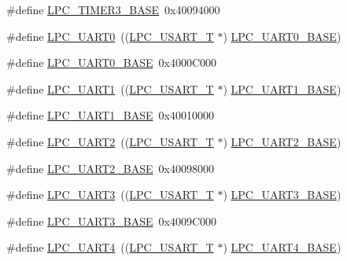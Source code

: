 \begin{DoxyCompactItemize}
\item 
\#define \hyperlink{group__PERIPH__407X__8X__BASE_ga002e95d51eef32473052ea2575440eac}{L\+P\+C\+\_\+\+T\+I\+M\+E\+R3\+\_\+\+B\+A\+SE}~0x40094000
\item 
\#define \hyperlink{group__PERIPH__407X__8X__BASE_ga6ba29f0f9b8af2f72e303533185bcc82}{L\+P\+C\+\_\+\+U\+A\+R\+T0}~((\hyperlink{structLPC__USART__T}{L\+P\+C\+\_\+\+U\+S\+A\+R\+T\+\_\+T}            $\ast$) \hyperlink{group__PERIPH__407X__8X__BASE_gaa96fb70405a1298b350fc6f0ad0af997}{L\+P\+C\+\_\+\+U\+A\+R\+T0\+\_\+\+B\+A\+SE})
\item 
\#define \hyperlink{group__PERIPH__407X__8X__BASE_gaa96fb70405a1298b350fc6f0ad0af997}{L\+P\+C\+\_\+\+U\+A\+R\+T0\+\_\+\+B\+A\+SE}~0x4000\+C000
\item 
\#define \hyperlink{group__PERIPH__407X__8X__BASE_ga83ea0dab4dcb7411c2e1de20050a4d2d}{L\+P\+C\+\_\+\+U\+A\+R\+T1}~((\hyperlink{structLPC__USART__T}{L\+P\+C\+\_\+\+U\+S\+A\+R\+T\+\_\+T}            $\ast$) \hyperlink{group__PERIPH__407X__8X__BASE_ga18e8f96b25e3f343bdd7ba552ae7a617}{L\+P\+C\+\_\+\+U\+A\+R\+T1\+\_\+\+B\+A\+SE})
\item 
\#define \hyperlink{group__PERIPH__407X__8X__BASE_ga18e8f96b25e3f343bdd7ba552ae7a617}{L\+P\+C\+\_\+\+U\+A\+R\+T1\+\_\+\+B\+A\+SE}~0x40010000
\item 
\#define \hyperlink{group__PERIPH__407X__8X__BASE_gac8badf231948fc9216d416c71a34e924}{L\+P\+C\+\_\+\+U\+A\+R\+T2}~((\hyperlink{structLPC__USART__T}{L\+P\+C\+\_\+\+U\+S\+A\+R\+T\+\_\+T}            $\ast$) \hyperlink{group__PERIPH__407X__8X__BASE_ga8c3873ab74db743465b038c74b365281}{L\+P\+C\+\_\+\+U\+A\+R\+T2\+\_\+\+B\+A\+SE})
\item 
\#define \hyperlink{group__PERIPH__407X__8X__BASE_ga8c3873ab74db743465b038c74b365281}{L\+P\+C\+\_\+\+U\+A\+R\+T2\+\_\+\+B\+A\+SE}~0x40098000
\item 
\#define \hyperlink{group__PERIPH__407X__8X__BASE_ga61c2bf57d66b50108cdec6878f9e8ee5}{L\+P\+C\+\_\+\+U\+A\+R\+T3}~((\hyperlink{structLPC__USART__T}{L\+P\+C\+\_\+\+U\+S\+A\+R\+T\+\_\+T}            $\ast$) \hyperlink{group__PERIPH__407X__8X__BASE_gac8dc517d5e03d4ca7666c18c89d5052e}{L\+P\+C\+\_\+\+U\+A\+R\+T3\+\_\+\+B\+A\+SE})
\item 
\#define \hyperlink{group__PERIPH__407X__8X__BASE_gac8dc517d5e03d4ca7666c18c89d5052e}{L\+P\+C\+\_\+\+U\+A\+R\+T3\+\_\+\+B\+A\+SE}~0x4009\+C000
\item 
\#define \hyperlink{group__PERIPH__407X__8X__BASE_gac023ca54f076d863ce21045365ebca63}{L\+P\+C\+\_\+\+U\+A\+R\+T4}~((\hyperlink{structLPC__USART__T}{L\+P\+C\+\_\+\+U\+S\+A\+R\+T\+\_\+T}            $\ast$) \hyperlink{group__PERIPH__407X__8X__BASE_ga52bf68ce53e20c93366ba5496e98f5c8}{L\+P\+C\+\_\+\+U\+A\+R\+T4\+\_\+\+B\+A\+SE})

\end{DoxyCompactItemize}
